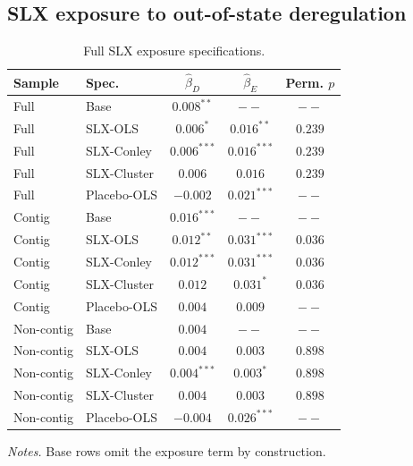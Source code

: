 \subsection{SLX exposure to out-of-state deregulation}
\begin{table}[htbp]
  \centering
  \caption{Full SLX exposure specifications.}
  \label{tab:slx-full}
  \footnotesize
  \begin{tabular}{llccc}
    \toprule
    Sample & Spec. & $\hat\beta_D$ & $\hat\beta_E$ & Perm. $p$ \\
    \midrule
    Full & Base & $0.008^{**}$ & $--$ & $--$ \\
    Full & SLX-OLS & $0.006^{*}$ & $0.016^{**}$ & $0.239$ \\
    Full & SLX-Conley & $0.006^{***}$ & $0.016^{***}$ & $0.239$ \\
    Full & SLX-Cluster & $0.006$ & $0.016$ & $0.239$ \\
    Full & Placebo-OLS & $-0.002$ & $0.021^{***}$ & $--$ \\
    \addlinespace
    Contig & Base & $0.016^{***}$ & $--$ & $--$ \\
    Contig & SLX-OLS & $0.012^{**}$ & $0.031^{***}$ & $0.036$ \\
    Contig & SLX-Conley & $0.012^{***}$ & $0.031^{***}$ & $0.036$ \\
    Contig & SLX-Cluster & $0.012$ & $0.031^{*}$ & $0.036$ \\
    Contig & Placebo-OLS & $0.004$ & $0.009$ & $--$ \\
    \addlinespace
    Non-contig & Base & $0.004$ & $--$ & $--$ \\
    Non-contig & SLX-OLS & $0.004$ & $0.003$ & $0.898$ \\
    Non-contig & SLX-Conley & $0.004^{***}$ & $0.003^{*}$ & $0.898$ \\
    Non-contig & SLX-Cluster & $0.004$ & $0.003$ & $0.898$ \\
    Non-contig & Placebo-OLS & $-0.004$ & $0.026^{***}$ & $--$ \\
    \bottomrule
  \end{tabular}
  \begin{tablenotes}\footnotesize
  \item \emph{Notes.} Base rows omit the exposure term by construction.
  \end{tablenotes}
\end{table}
 
